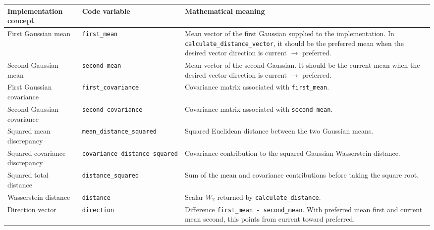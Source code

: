 \documentclass[a4paper]{article}
\begin{document}
   \begin{table}[H]
      \centering
      \small
      \setlength{\tabcolsep}{4pt}
      \begin{adjustbox}{max width=\textwidth}
      \begin{tabular}{p{} p{} p{}}
         \hline
         \textbf{Implementation concept} & \textbf{Code variable} & \textbf{Mathematical meaning} \\
         \hline

         First Gaussian mean
         & \texttt{first\_mean}
         & Mean vector of the first Gaussian supplied to the implementation. In \texttt{calculate\_distance\_vector}, it should be the preferred mean when the desired vector direction is current $\rightarrow$ preferred. \\

         Second Gaussian mean
         & \texttt{second\_mean}
         & Mean vector of the second Gaussian. It should be the current mean when the desired vector direction is current $\rightarrow$ preferred. \\

         First Gaussian covariance
         & \texttt{first\_covariance}
         & Covariance matrix associated with \texttt{first\_mean}. \\

         Second Gaussian covariance
         & \texttt{second\_covariance}
         & Covariance matrix associated with \texttt{second\_mean}. \\

         Squared mean discrepancy
         & \texttt{mean\_distance\_squared}
         & Squared Euclidean distance between the two Gaussian means. \\

         Squared covariance discrepancy
         & \texttt{covariance\_distance\_squared}
         & Covariance contribution to the squared Gaussian Wasserstein distance. \\

         Squared total distance
         & \texttt{distance\_squared}
         & Sum of the mean and covariance contributions before taking the square root. \\

         Wasserstein distance
         & \texttt{distance}
         & Scalar $W_2$ returned by \texttt{calculate\_distance}. \\

         Direction vector
         & \texttt{direction}
         & Difference \texttt{first\_mean - second\_mean}. With preferred mean first and current mean second, this points from current toward preferred. \\


\end{tabular}
\end{adjustbox}
\end{table}
\end{document}
